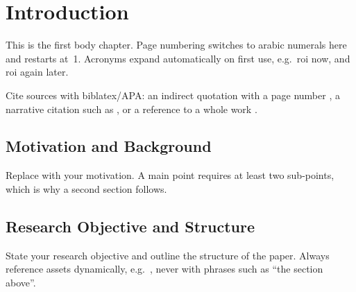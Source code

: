 \chapter{Introduction}
\label{chap:introduction}

This is the first body chapter. Page numbering switches to arabic
numerals here and restarts at~1. Acronyms expand automatically on first
use, e.g.\ \gls{roi} now, and \gls{roi} again later.

Cite sources with biblatex/APA: an indirect quotation with a page number
\parencite[12]{example2024}, a narrative citation such as
\textcite{example2024}, or a reference to a whole work \parencite{example2024}.

\section{Motivation and Background}
\label{sec:motivation}

Replace with your motivation. A main point requires at least two
sub-points, which is why a second section follows.

\section{Research Objective and Structure}
\label{sec:objective}

State your research objective and outline the structure of the paper.
Always reference assets dynamically, e.g.\ , never
with phrases such as \enquote{the section above}.
